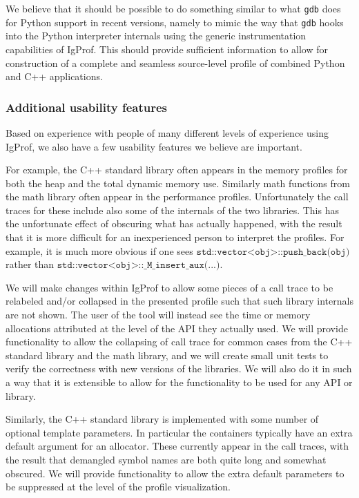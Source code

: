 \documentclass[notitlepage,letter,12pt]{article}
\begin{document}
We believe that it should be possible to do something similar to what 
\texttt{gdb} does for Python support in recent versions, namely to mimic the
way that \texttt{gdb} hooks into the Python interpreter internals using the 
generic instrumentation capabilities of IgProf. This should provide
sufficient information to allow for construction of a complete and
seamless source-level profile of combined Python and C++ applications.



\subsubsection{Additional usability features}

Based on experience with people of many different levels of experience
using IgProf, we also have a few usability features we believe are
important.

For example, the C++ standard library often appears in the memory
profiles for both the heap and the total dynamic memory use. Similarly
math functions from the math library often appear in the performance
profiles. Unfortunately the call traces for these include also some
of the internals of the two libraries. This has the unfortunate
effect of obscuring what has actually happened, with the result
that it is more difficult for an inexperienced person to interpret
the profiles. For example, it is much more obvious if one sees
$\texttt{std::vector<obj>::push\_back(obj)}$ rather than $\texttt{std::vector<obj>::\_M\_insert\_aux(...)}$.

We will make changes within IgProf to allow some pieces of a call 
trace to be relabeled and/or collapsed in the presented profile such that 
such library internals are not shown. The user of the tool will instead see
the time or memory allocations attributed at the level of the API they
actually used. We will provide functionality to allow the collapsing of
call trace for common cases from the C++ standard library and the math library,
and we will create small unit tests to verify the correctness with
new versions of the libraries. We will also do it in such a way that 
it is extensible to allow for the functionality to be used for any 
API or library. 

Similarly, the C++ standard library is implemented with some number
of optional template parameters. In particular the containers typically
have an extra default argument for an allocator. These currently appear
in the call traces, with the result that demangled symbol names are
both quite long and somewhat obscured. We will provide functionality
to allow the extra default parameters to be suppressed at the level
of the profile visualization.
\end{document}
